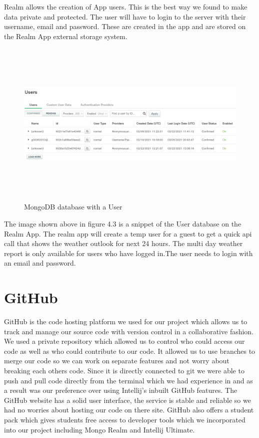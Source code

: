 Realm allows the creation of App users. This is the best way we found to make data private and protected. The user will have to login to the server with their username, email and password. These are created in the app and are stored on the Realm App external storage system.
\begin{figure}[H]
    \centering
    \includegraphics[width=15cm,height = 8cm]{img/Users.PNG}
    \caption{MongoDB database with a User}
    \label{fig:altas config}
\end{figure}
The image shown above in figure 4.3 is a snippet of the User database on the Realm App. The realm app will create a temp user for a guest to get a quick api call that shows the weather outlook for next 24 hours. The multi day weather report is only available for users who have logged in.The user needs to login with an email and password.

\section{GitHub}
GitHub is the code hosting platform we used for our project which allows us to track and manage our source code with version control in a collaborative fashion. We used a private repository which allowed us to control who could access our code as well as who could contribute to our code. It allowed us to use branches to merge our code so we can work on separate features and not worry about breaking each others code. Since it is directly connected to git we were able to push and pull code directly from the terminal which we had experience in and as a result was our preference over using Intellij's inbuilt GitHub features. The GitHub website has a solid user interface, the service is stable and reliable so we had no worries about hosting our code on there site. GitHub also offers a student pack which gives students free access to developer tools which we incorporated into our project including Mongo Realm and Intellij Ultimate.
